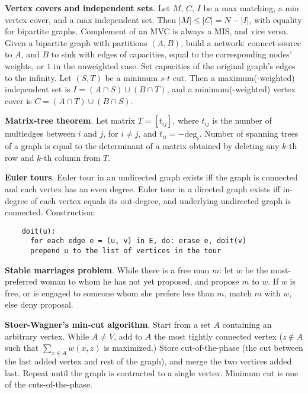 \documentclass[a4paper, 12pt]{article}
\let\le=\leqslant
\newcommand{\Topic}[1]{\textbf{#1}}
\begin{document}
\Topic{Vertex covers and independent sets}.
Let $M$, $C$, $I$ be a max matching, a min vertex cover, and a max independent set.
Then $|M| \le |C| = N - |I|$, with equality for bipartite graphs.
Complement of an MVC is always a MIS, and vice versa.
Given a bipartite graph with partitions $(A, B)$, build a network:
connect source to $A$, and $B$ to sink with edges of capacities, equal to
the corresponding nodes' weights, or $1$ in the unweighted case.
Set capacities of the original graph's edges to the infinity.
Let $(S,T)$ be a minimum $s$-$t$ cut.
Then a maximum(-weighted) independent set is $I = (A \cap S) \cup (B \cap T)$,
and a minimum(-weighted) vertex cover is $C = (A \cap T) \cup (B \cap S)$.

\Topic{Matrix-tree theorem}.
Let matrix $T = [t_{ij}]$, where $t_{ij}$ is the number of multiedges
between $i$ and $j$, for $i \ne j$, and $t_{ii} = -\mbox{deg}_i$.
Number of spanning trees of a graph is equal to the determinant of
a matrix obtained by deleting any $k$-th row and $k$-th column from $T$.

\Topic{Euler tours}.
Euler tour in an undirected graph exists iff the graph is connected and each
vertex has an even degree.  Euler tour in a directed graph exists iff in-degree
of each vertex equals its out-degree, and underlying undirected graph is connected.
Construction:
\vspace{-5mm}
\begin{verbatim}
    doit(u):
      for each edge e = (u, v) in E, do: erase e, doit(v)
      prepend u to the list of vertices in the tour
\end{verbatim}
\vspace{-2mm}

\Topic{Stable marriages problem}.
While there is a free man $m$: let $w$ be the most-preferred woman to whom he
has not yet proposed, and propose $m$ to $w$. If $w$ is free, or is engaged to someone whom
she prefers less than $m$, match $m$ with $w$, else deny proposal.

\Topic{Stoer-Wagner's min-cut algorithm}.
Start from a set $A$ containing an arbitrary vertex.
While $A \ne V$, add to $A$ the most tightly connected vertex
($z \notin A$ such that $\sum_{x \in A} w(x, z)$ is maximized.)
Store cut-of-the-phase (the cut between the last added vertex and rest of
the graph), and merge the two vertices added last.  Repeat until the graph
is contracted to a single vertex.  Minimum cut is one of the cuts-of-the-phase.
\end{document}
